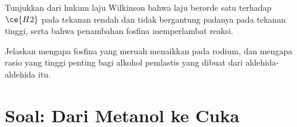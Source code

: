 \begin{exercise}[$\star\star\star$]\label{exo:b3:homogeneous-catalysis:11}
Tunjukkan dari hukum laju Wilkinson bahwa laju berorde satu terhadap $\ce{H2}$ pada tekanan rendah
dan tidak bergantung padanya pada tekanan tinggi, serta bahwa penambahan fosfina memperlambat
reaksi.
\end{exercise}

\begin{exercise}[$\star\star\star$]\label{exo:b3:homogeneous-catalysis:12}
Jelaskan mengapa fosfina yang meruah menaikkan  pada
 rodium, dan mengapa rasio yang tinggi penting bagi alkohol pemlastis yang dibuat
dari aldehida-aldehida itu.
\end{exercise}

\section{Soal: Dari Metanol ke Cuka}


